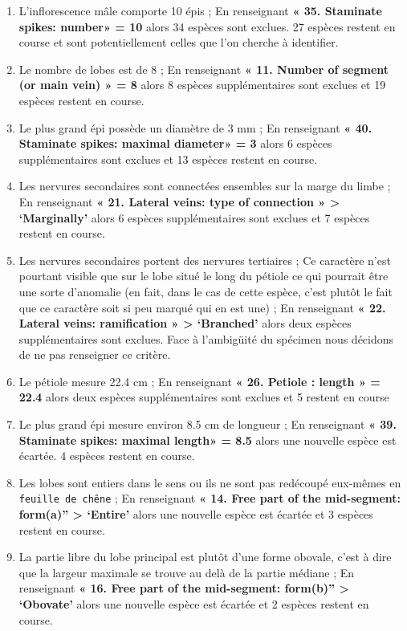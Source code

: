 \documentclass[a4paper]{article}
\providecommand{\tightlist}{%
  \setlength{\itemsep}{0pt}\setlength{\parskip}{0pt}}
\theoremstyle{definition}
\theoremstyle{definition}
\theoremstyle{definition}
\theoremstyle{remark}
\begin{document}
\begin{enumerate}
\def\labelenumi{\arabic{enumi})}
\tightlist
\item
  L'inflorescence mâle comporte 10 épis ; En renseignant \textbf{« 35.
  Staminate spikes: number» = 10} alors 34 espèces sont exclues. 27
  espèces restent en course et sont potentiellement celles que l'on
  cherche à identifier.
\item
  Le nombre de lobes est de 8 ; En renseignant \textbf{« 11. Number of
  segment (or main vein) » = 8} alors 8 espèces supplémentaires sont
  exclues et 19 espèces restent en course.
\item
  Le plus grand épi possède un diamètre de 3 mm ; En renseignant
  \textbf{« 40. Staminate spikes: maximal diameter» = 3} alors 6 espèces
  supplémentaires sont exclues et 13 espèces restent en course.
\item
  Les nervures secondaires sont connectées ensembles sur la marge du
  limbe ; En renseignant \textbf{« 21. Lateral veins: type of connection
  » \textgreater{} `Marginally'} alors 6 espèces supplémentaires sont
  exclues et 7 espèces restent en course.
\item
  Les nervures secondaires portent des nervures tertiaires ; Ce
  caractère n'est pourtant visible que sur le lobe situé le long du
  pétiole ce qui pourrait être une sorte d'anomalie (en fait, dans le
  cas de cette espèce, c'est plutôt le fait que ce caractère soit si peu
  marqué qui en est une) ; En renseignant \textbf{« 22. Lateral veins:
  ramification » \textgreater{} `Branched'} alors deux espèces
  supplémentaires sont exclues. Face à l'ambigüité du spécimen nous
  décidons de ne pas renseigner ce critère.
\item
  Le pétiole mesure 22.4 cm ; En renseignant \textbf{« 26. Petiole :
  length » = 22.4} alors deux espèces supplémentaires sont exclues et 5
  restent en course
\item
  Le plus grand épi mesure environ 8.5 cm de longueur ; En renseignant
  \textbf{« 39. Staminate spikes: maximal length» = 8.5} alors une
  nouvelle espèce est écartée. 4 espèces restent en course.
\item
  Les lobes sont entiers dans le sens ou ils ne sont pas redécoupé
  eux-mêmes en \texttt{feuille\ de\ chêne} ; En renseignant \textbf{«
  14. Free part of the mid-segment: form(a)'' \textgreater{} `Entire'}
  alors une nouvelle espèce est écartée et 3 espèces restent en course.
\item
  La partie libre du lobe principal est plutôt d'une forme obovale,
  c'est à dire que la largeur maximale se trouve au delà de la partie
  médiane ; En renseignant \textbf{« 16. Free part of the mid-segment:
  form(b)'' \textgreater{} `Obovate'} alors une nouvelle espèce est
  écartée et 2 espèces restent en course.
\end{enumerate}
\end{document}
